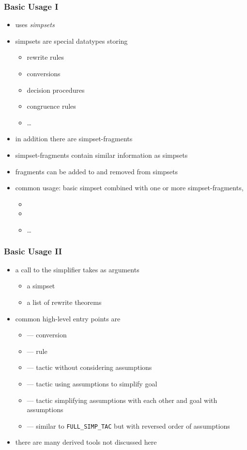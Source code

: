 \begin{frame}
\frametitle{Basic Usage I}

\begin{itemize}
\item {} uses \emph{simpsets}
\item simpsets are special datatypes storing
\begin{itemize}
\item rewrite rules
\item conversions
\item decision procedures
\item congruence rules
\item \ldots
\end{itemize}
\item in addition there are simpset-fragments
\item simpset-fragments contain similar information as simpsets
\item fragments can be added to and removed from simpsets
\item common usage: basic simpset combined with one or more simpset-fragments, \eg
 \begin{itemize}
 \item {}
 \item {}
 \item \ldots
  \end{itemize}
\end{itemize}
\end{frame}


\begin{frame}
\frametitle{Basic Usage II}

\begin{itemize}
\item a call to the simplifier takes as arguments
\begin{itemize}
\item a simpset
\item a list of rewrite theorems
\end{itemize}  
\item common high-level entry points are
\begin{itemize}
\item {} --- conversion
\item {} --- rule
\item {} --- tactic without considering assumptions
\item {} --- tactic using assumptions to simplify goal
\item {} --- tactic simplifying assumptions with each other and goal with assumptions
\item {} --- similar to \texttt{FULL\_SIMP\_TAC} but with reversed order of assumptions
\end{itemize}
\item there are many derived tools not discussed here
\end{itemize}
\end{frame}

